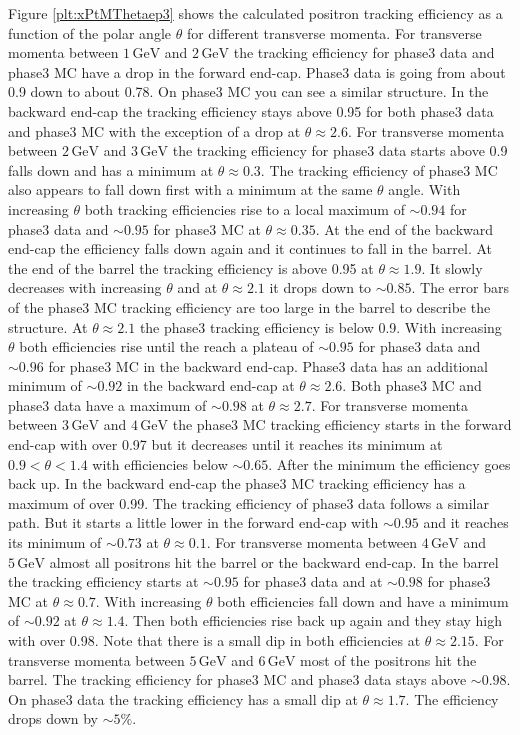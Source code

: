 \documentclass[a4paper,11pt,twosided,final,german,openbib,pdftex,listof=totoc,bibliography=totoc]{scrbook}
\begin{document}
Figure \ref{plt:xPtMThetaep3} shows the calculated positron tracking efficiency as a function of the polar angle $\theta$ for different transverse momenta.
For transverse momenta between $1\,\textrm{GeV}$ and $2\,\textrm{GeV}$ the tracking efficiency for phase3 data and phase3 MC have a drop in the forward end-cap. Phase3 data is going from about 0.9 down to about 0.78. On phase3 MC you can see a similar structure. In the backward end-cap the tracking efficiency stays above 0.95 for both phase3 data and phase3 MC with the exception of a drop at $\theta \approx 2.6$.
For transverse momenta between $2\,\textrm{GeV}$ and $3\,\textrm{GeV}$ the tracking efficiency for phase3 data starts above 0.9 falls down and has a minimum at $\theta \approx 0.3$. The tracking efficiency of phase3 MC also appears to fall down first with a minimum at the same $\theta$ angle. With increasing $\theta$ both tracking efficiencies rise to a local maximum of $\sim 0.94$ for phase3 data and $\sim 0.95$ for phase3 MC at $\theta \approx 0.35$. At the end of the backward end-cap the efficiency falls down again and it continues to fall in the barrel. At the end of the barrel the tracking efficiency is above 0.95 at $\theta \approx 1.9$. It slowly decreases with increasing $\theta$ and at $\theta \approx 2.1$ it drops down to $\sim 0.85$. The error bars of the phase3 MC tracking efficiency are too large in the barrel to describe the structure. At $\theta \approx 2.1$ the phase3 tracking efficiency is below 0.9. With increasing $\theta$ both efficiencies rise until the reach a plateau of $\sim 0.95$ for phase3 data and $\sim 0.96$ for phase3 MC in the backward end-cap. Phase3 data has an additional minimum of $\sim 0.92$ in the backward end-cap at $\theta \approx 2.6$. Both phase3 MC and phase3 data have a maximum of $\sim 0.98$ at $\theta \approx 2.7$.
For transverse momenta between $3\,\textrm{GeV}$ and $4\,\textrm{GeV}$ the phase3 MC tracking efficiency starts in the forward end-cap with over 0.97 but it decreases until it reaches its minimum at $0.9 < \theta < 1.4$ with efficiencies below $\sim 0.65$. After the minimum the efficiency goes back up. In the backward end-cap the phase3 MC tracking efficiency has a maximum of over 0.99. The tracking efficiency of phase3 data follows a similar path. But it starts a little lower in the forward end-cap with $\sim 0.95$ and it reaches its minimum of $\sim 0.73$ at $\theta \approx 0.1$.
For transverse momenta between $4\,\textrm{GeV}$ and $5\,\textrm{GeV}$ almost all positrons hit the barrel or the backward end-cap. In the barrel the tracking efficiency starts at $\sim 0.95$ for phase3 data and at $\sim 0.98$ for phase3 MC at $\theta \approx 0.7$. With increasing $\theta$ both efficiencies fall down and have a minimum of $\sim 0.92$ at $\theta \approx 1.4$. Then both efficiencies rise back up again and they stay high with over 0.98. Note that there is a small dip in both efficiencies at $\theta \approx 2.15$.
For transverse momenta between $5\,\textrm{GeV}$ and $6\,\textrm{GeV}$ most of the positrons hit the barrel. The tracking efficiency for phase3 MC and phase3 data stays above $\sim 0.98$. On phase3 data the tracking efficiency has a small dip at $\theta \approx 1.7$. The efficiency drops down by $\sim 5\%$.
\end{document}

